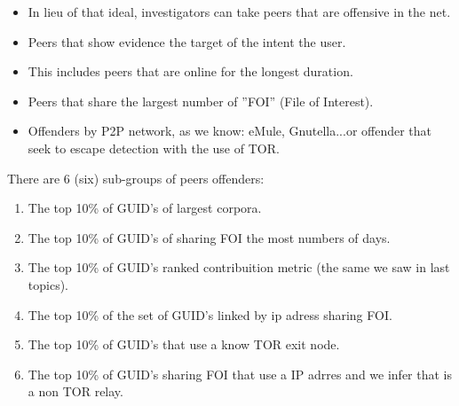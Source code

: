 \documentclass[notes]{beamer}
\begin{document}
\begin{frame}

\begin{itemize}

\item[\checkmark]In lieu of that ideal, investigators can take peers that are offensive in the net.

\item[\checkmark]Peers that show evidence the target of the intent the user.

\item[\checkmark]This includes peers that are online for the longest duration.

\item[\checkmark]Peers that share the largest number of ''FOI'' (File of Interest).

\item[\checkmark]Offenders by P2P network, as we know: eMule, Gnutella...or offender that seek to escape detection with the use of TOR.

\end{itemize}

\end{frame}

\begin{frame}

\begin{block}{There are 6 (six) sub-groups of peers offenders:}

\begin{enumerate}

\item The top 10\% of GUID’s of largest corpora.

\item The top 10\% of GUID’s of sharing FOI the most numbers of days.

\item The top 10\% of GUID’s ranked contribuition metric (the same we saw in last topics).

\item The top 10\% of the set of GUID’s linked by ip adress sharing FOI.

\item The top 10\% of GUID’s that use a know TOR exit node.

\item The top 10\% of GUID’s  sharing FOI that use a IP adrres and we infer that is a non TOR relay.

\end{enumerate}

\end{block}

\end{frame}
\end{document}
